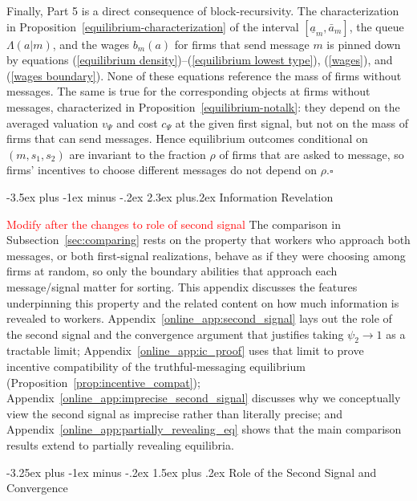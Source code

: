 \documentclass[12pt]{article}
\makeatletter
\renewcommand{\section}{%
  \@startsection{section}{1}{\z@}%
  {-3.5ex plus -1ex minus -.2ex}%
  {2.3ex plus.2ex}%
  {\normalfont\Large\bfseries}%
}
\renewcommand{\subsection}{%
  \@startsection{subsection}{2}{\z@}%
  {-3.25ex plus -1ex minus -.2ex}%
  {1.5ex plus .2ex}%
  {\normalfont\large\bfseries}%
}
\makeatother
\begin{document}
Finally, Part 5 is a direct consequence of block-recursivity. The characterization in Proposition~\ref{equilibrium-characterization} of the interval $[\underline{a}_{m},\bar{a}_{m}]$, the queue $\Lambda(a|m)$, and the wages $b_{m}(a)$ for firms that send message $m$ is pinned down by equations (\ref{equilibrium density})--(\ref{equilibrium lowest type}), (\ref{wages}), and (\ref{wages boundary}). None of these equations reference the mass of firms without messages. The same is true for the corresponding objects at firms without messages, characterized in Proposition~\ref{equilibrium-notalk}: they depend on the averaged valuation $v_{\Psi}$ and cost $c_{\Psi}$ at the given first signal, but not on the mass of firms that can send messages. Hence equilibrium outcomes conditional on $(m,s_{1},s_{2})$ are invariant to the fraction $\rho$ of firms that are asked to message, so firms' incentives to choose different messages do not depend on $\rho$.$\square$






\section{Information Revelation}
\label{online_app:info_revelation}

\textcolor{red}{Modify after the changes to role of second signal} The comparison in Subsection~\ref{sec:comparing} rests on the property that workers who approach both messages, or both first-signal realizations, behave as if they were choosing among firms at random, so only the boundary abilities that approach each message/signal matter for sorting. This appendix discusses the features underpinning this property and the related content on how much information is revealed to workers. Appendix~\ref{online_app:second_signal} lays out the role of the second signal and the convergence argument that justifies taking $\psi_{2}\to 1$ as a tractable limit; Appendix~\ref{online_app:ic_proof} uses that limit to prove incentive compatibility of the truthful-messaging equilibrium (Proposition~\ref{prop:incentive_compat}); Appendix~\ref{online_app:imprecise_second_signal} discusses why we conceptually view the second signal as imprecise rather than literally precise; and Appendix~\ref{online_app:partially_revealing_eq} shows that the main comparison results extend to partially revealing equilibria.


\subsection{Role of the Second Signal and Convergence}
\label{online_app:second_signal}
\end{document}
